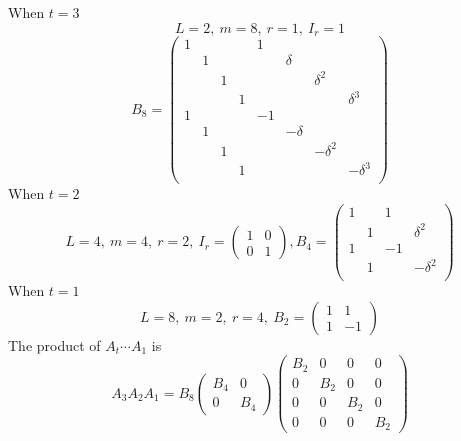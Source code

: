 \newpage

When $t = 3$ \[
    L = 2,\ m = 8,\ r = 1,\ I_r = 1
\]
\[
    B_8 = \begin{pmatrix}
        1& & & &1 & & & \\
        & 1 & & & & \delta & & \\  
        & & 1& & & & \delta^2 & \\
        & & & 1& & & & \delta^3 \\
        1& & & &-1 & & & \\
        & 1 & & & & -\delta & & \\  
        & & 1& & & & -\delta^2 & \\
        & & & 1& & & & -\delta^3 \\
    \end{pmatrix}
\]
When $t = 2$ \[
    L = 4,\ m = 4,\ r = 2,\ I_r = \begin{pmatrix}
        1 & 0 \\
        0 & 1
    \end{pmatrix}, B_4 = \begin{pmatrix}
        1& & 1& \\  
        & 1& & \delta^2\\
        1& & -1& \\
        & 1& & -\delta^2\\
    \end{pmatrix}
\]
When $t = 1$ \[
    L = 8,\ m = 2,\ r = 4,\ B_2 = \begin{pmatrix}
        1 & 1 \\
        1 & -1
    \end{pmatrix}
\]
The product of $A_t \cdots A_1$ is \[
    A_3 A_2 A_1 = B_8 \begin{pmatrix}
        B_4 & 0 \\
        0 & B_4
    \end{pmatrix} \begin{pmatrix}
        B_2 & 0 & 0 & 0 \\
        0 & B_2 & 0 & 0 \\
        0 & 0 & B_2 & 0 \\
        0 & 0 & 0 & B_2
    \end{pmatrix}
\]

